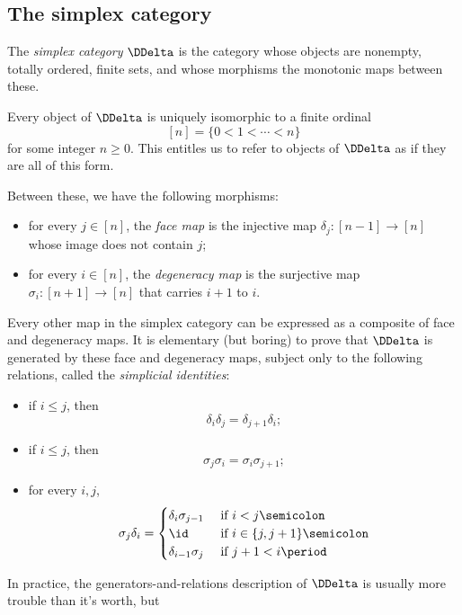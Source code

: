 \subsection{The simplex category}%
\label{sub:Thesimplexcategory}

\begin{definition}
  The \emph{simplex category} $\DDelta$ is the category
  whose objects are nonempty, totally ordered, finite sets,
  and whose morphisms the monotonic maps between these.
\end{definition}

Every object of $\DDelta$ is uniquely isomorphic to a finite ordinal
\[
  [n] = \{ 0 < 1 < \cdots < n \}
\]
for some integer $n \geq 0$.
This entitles us to refer to objects of $\DDelta$ as if they are all of this form.

Between these, we have the following morphisms:
\begin{itemize}
  \item for every $j \in [n]$, the \emph{face map} is the injective map $\delta_j \colon [n-1] \to [n]$ whose image does not contain $j$;
  \item for every $i \in [n]$, the \emph{degeneracy map} is the surjective map $\sigma_i \colon [n+1] \to [n]$ that carries $i+1$ to $i$.
\end{itemize}
Every other map in the simplex category can be expressed as a composite of face and degeneracy maps.
It is elementary (but boring) to prove that $\DDelta$ is generated by these face and degeneracy maps, subject only to the following relations, called the \emph{simplicial identities}:
\begin{itemize}
  \item if $i \leq j$, then
  \[
    \delta_i \delta_j = \delta_{j+1} \delta_i \semicolon
  \]
  \item if $i \leq j$, then
  \[
    \sigma_j \sigma_i = \sigma_i \sigma_{j+1} \semicolon
  \]
\item for every $i,j$, 
  \[
    \sigma_j \delta_i = \begin{cases}
      \delta_i \sigma_{j-1} & \text{ if } i < j \semicolon \\
      \id                   & \text{ if } i \in \{j,j+1\} \semicolon \\
      \delta_{i-1} \sigma_j & \text{ if } j+1 < i \period
    \end{cases}
  \]
\end{itemize}
In practice, the generators-and-relations description of $\DDelta$ is usually more trouble than it's worth, but
